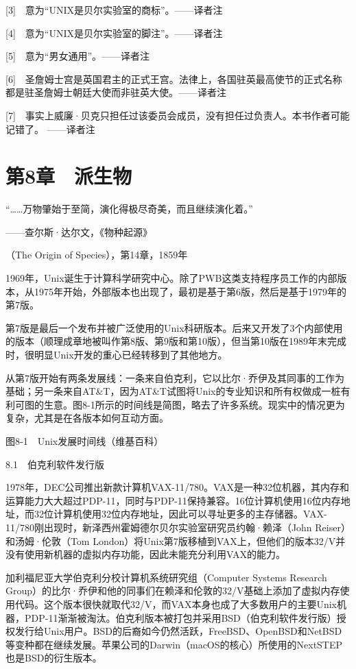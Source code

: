 \documentclass[a4paper,12pt,UTF8,twoside]{ctexbook}
\begin{document}
[3]　意为“UNIX是贝尔实验室的商标”。——译者注

[4]　意为“UNIX是贝尔实验室的脚注”。——译者注

[5]　意为“男女通用”。——译者注

[6]　圣詹姆士宫是英国君主的正式王宫。法律上，各国驻英最高使节的正式名称都是驻圣詹姆士朝廷大使而非驻英大使。——译者注

[7]　事实上威廉·贝克只担任过该委员会成员，没有担任过负责人。本书作者可能记错了。 ——译者注





\chapter{第8章　派生物}


“……万物肇始于至简，演化得极尽奇美，而且继续演化着。”

——查尔斯·达尔文，《物种起源》

（The Origin of Species），第14章，1859年

1969年，Unix诞生于计算科学研究中心。除了PWB这类支持程序员工作的内部版本，从1975年开始，外部版本也出现了，最初是基于第6版，然后是基于1979年的第7版。

第7版是最后一个发布并被广泛使用的Unix科研版本。后来又开发了3个内部使用的版本（顺理成章地被叫作第8版、第9版和第10版），但当第10版在1989年末完成时，很明显Unix开发的重心已经转移到了其他地方。

从第7版开始有两条发展线：一条来自伯克利，它以比尔·乔伊及其同事的工作为基础；另一条来自AT\&T，因为AT\&T试图将Unix的专业知识和所有权做成一桩有利可图的生意。图8-1所示的时间线是简图，略去了许多系统。现实中的情况更为复杂，尤其是在各版本如何互动方面。



图8-1　Unix发展时间线（维基百科）





8.1　伯克利软件发行版


1978年，DEC公司推出新款计算机VAX-11/780。VAX是一种32位机器，其内存和运算能力大大超过PDP-11，同时与PDP-11保持兼容。16位计算机使用16位内存地址，而32位计算机使用32位内存地址，因此可以寻址更多的主存储器。VAX-11/780刚出现时，新泽西州霍姆德尔贝尔实验室研究员约翰·赖泽（John Reiser）和汤姆·伦敦（Tom London）将Unix第7版移植到VAX上，但他们的版本32/V并没有使用新机器的虚拟内存功能，因此未能充分利用VAX的能力。

加利福尼亚大学伯克利分校计算机系统研究组（Computer Systems Research Group）的比尔·乔伊和他的同事们在赖泽和伦敦的32/V基础上添加了虚拟内存使用代码。这个版本很快就取代32/V，而VAX本身也成了大多数用户的主要Unix机器，PDP-11渐渐被淘汰。伯克利版本被打包并采用BSD（伯克利软件发行版）授权发行给Unix用户。BSD的后裔如今仍然活跃，FreeBSD、OpenBSD和NetBSD等变种都在继续发展。苹果公司的Darwin（macOS的核心）所使用的NextSTEP也是BSD的衍生版本。
\end{document}
